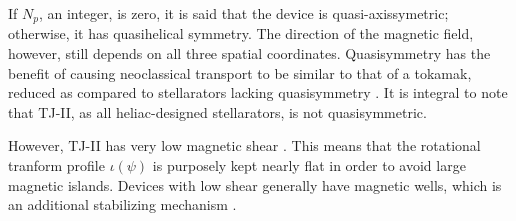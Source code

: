 \documentclass[a4paper]{article}
\begin{document}
If $N_p$, an integer, is zero, it is said that the device is quasi-axissymetric; otherwise, it has quasihelical symmetry.
The direction of the magnetic field, however, still depends on all three spatial coordinates.
Quasisymmetry has the benefit of causing neoclassical transport to be similar to that of a tokamak, reduced as compared to stellarators lacking quasisymmetry \cite{boozer_what_1998}.
It is integral to note that TJ-II, as all heliac-designed stellarators, is not quasisymmetric.

However, TJ-II has very low magnetic shear \cite{milligen_mhd_2012}.
This means that the rotational tranform profile $\iota(\psi)$ is purposely kept nearly flat in order to avoid large magnetic islands.
Devices with low shear generally have magnetic wells, which is an additional stabilizing mechanism \cite{aguilera_magnetic_2015}.

\end{document}
